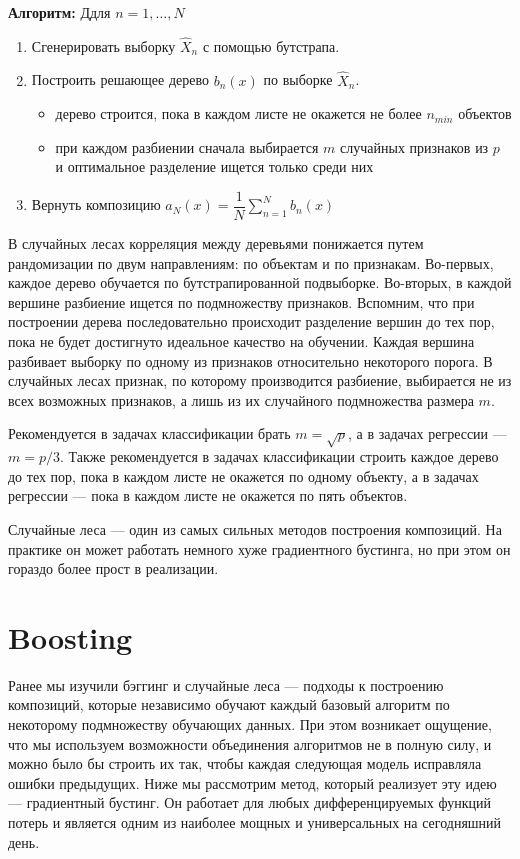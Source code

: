 \documentclass{article}
\begin{document}
\textbf{Алгоритм:}
Ддля $n=1,\ldots,N$
\begin{enumerate}
	\item Сгенерировать выборку $\hat{X}_n$ с помощью бутстрапа.
	\item Построить решающее дерево $b_n(x)$ по выборке $\hat{X}_n$.
	\begin{itemize}
		\item дерево строится, пока в каждом листе не окажется не более $n_{min}$ объектов
		\item при каждом разбиении сначала выбирается $m$ случайных признаков из $p$ и оптимальное разделение ищется только среди них
	\end{itemize}
	\item Вернуть композицию $a_N(x) = \dfrac{1}{N}\sum_{n=1}^{N}b_n(x)$
\end{enumerate}

В случайных лесах корреляция между деревьями понижается путем рандомизации по двум направлениям: по объектам и по признакам. Во-первых, каждое дерево обучается по бутстрапированной подвыборке. Во-вторых, в каждой вершине разбиение ищется по подмножеству признаков. Вспомним, что при построении дерева последовательно происходит разделение вершин до тех пор, пока не будет достигнуто идеальное качество на обучении. Каждая вершина разбивает выборку по одному из признаков относительно некоторого порога. В случайных лесах признак, по которому производится разбиение, выбирается не из всех возможных признаков, а лишь из их случайного подмножества размера $m$.

Рекомендуется в задачах классификации брать $m=\sqrt{p}$, а в задачах регрессии --- $m=p/3$. Также рекомендуется в задачах классификации строить каждое дерево до тех пор, пока в каждом листе не окажется по одному объекту, а в задачах регрессии — пока в каждом листе не окажется по пять объектов. 

Случайные леса --- один из самых сильных методов построения композиций. На практике он может работать немного хуже градиентного бустинга, но при этом он гораздо более прост в реализации.

\section{Boosting}

Ранее мы изучили бэггинг и случайные леса — подходы к построению композиций, которые независимо обучают каждый базовый алгоритм по некоторому подмножеству обучающих данных. При этом возникает ощущение, что мы используем
возможности объединения алгоритмов не в полную силу, и можно было бы строить их так, чтобы каждая следующая модель исправляла ошибки предыдущих. Ниже мы рассмотрим метод, который реализует эту идею — градиентный бустинг. Он работает для любых дифференцируемых функций потерь и является одним из наиболее мощных и универсальных на сегодняшний день.
\end{document}

